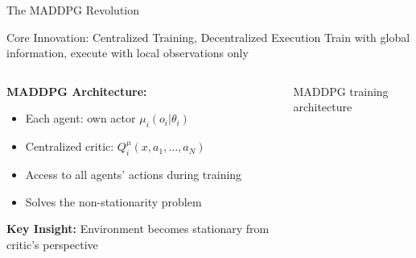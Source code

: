 \documentclass[aspectratio=169]{beamer}
\begin{document}
\begin{frame}{The MADDPG Revolution}
    
    \begin{block}{Core Innovation: Centralized Training, Decentralized Execution}
        Train with global information, execute with local observations only
    \end{block}
    \vfill
    \begin{columns}
        \begin{column}{0.6\textwidth}
            \textbf{MADDPG Architecture:}
            \begin{itemize}
                \item Each agent: own actor $\mu_i(o_i|\theta_i)$
                \item Centralized critic: $Q_i^\mu(x, a_1, \ldots, a_N)$
                \item Access to all agents' actions during training
                \item Solves the non-stationarity problem
            \end{itemize}
            \vfill
            \textbf{Key Insight:} Environment becomes stationary from critic's perspective \autocite{lowe_multi-agent_2017}
        \end{column}
        \begin{column}{0.4\textwidth}
            \centering
            \small{MADDPG training architecture}
        \end{column}
    \end{columns}
\end{frame}
\end{document}
